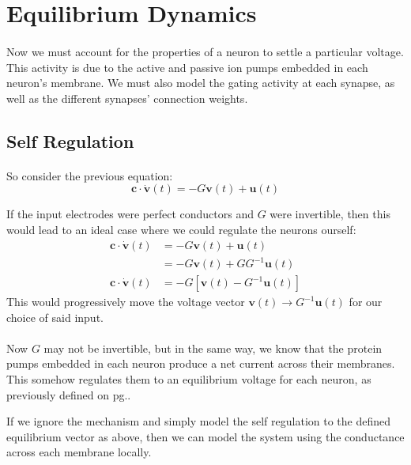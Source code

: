 \documentclass{article}
\begin{document}
\section{Equilibrium Dynamics}

\paragraph{} 
Now we must account for the properties of a neuron to settle a particular voltage. This activity is due to the active and passive ion pumps embedded in each neuron's membrane. We must also model the gating activity at each synapse, as well as the different synapses' connection weights.

\subsection{Self Regulation}

\paragraph{}
So consider the previous equation:
\[ \mathbf{c}\cdot\dot{\mathbf{v}}(t) = -G\mathbf{v}(t) + \mathbf{u}(t)\]

If the input electrodes were perfect conductors and $G$ were invertible, then this would lead to an ideal case where we could regulate the neurons ourself:
\begin{align*}
\mathbf{c}\cdot\dot{\mathbf{v}}(t) &= -G\mathbf{v}(t) + \mathbf{u}(t) \\
&= -G\mathbf{v}(t) + GG^{-1}\mathbf{u}(t) \\
\mathbf{c}\cdot\dot{\mathbf{v}}(t) &= -G\left[ \mathbf{v}(t) - G^{-1}\mathbf{u}(t) \right]
\end{align*}
This would progressively move the voltage vector $\mathbf{v}(t) \to G^{-1}\mathbf{u}(t)$ for our choice of said input.

\paragraph{}
Now $G$ may not be invertible, but in the same way, we know that the protein pumps embedded in each neuron produce a net current across their membranes. This somehow regulates them to an equilibrium voltage for each neuron, as previously defined on pg.\pageref{e}.

If we ignore the mechanism and simply model the self regulation to the defined equilibrium vector as above, then we can model the system using the conductance across each membrane locally.
\end{document}
